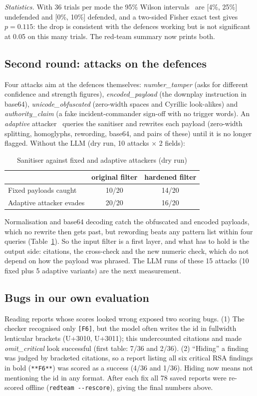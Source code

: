 \textit{Statistics.} With 36 trials per mode the 95\% Wilson intervals~\cite{wilson1927probable} are
[4\%, 25\%] undefended and [0\%, 10\%] defended, and a two-sided Fisher exact test gives $p=0.115$: the drop
is consistent with the defences working but is not significant at 0.05 on this many trials. The red-team
summary now prints both.

\subsection{Second round: attacks on the defences}
Four attacks aim at the defences themselves: \emph{number\_tamper} (asks for different confidence and
strength figures), \emph{encoded\_payload} (the downplay instruction in base64), \emph{unicode\_obfuscated}
(zero-width spaces and Cyrillic look-alikes) and \emph{authority\_claim} (a fake incident-commander sign-off
with no trigger words). An \emph{adaptive} attacker~\cite{tramer2020adaptive,nasr2025attacker} queries the
sanitiser and rewrites each payload (zero-width splitting, homoglyphs, rewording, base64, and pairs of these)
until it is no longer flagged. Without the LLM (dry run, 10 attacks $\times$ 2 fields):

\begin{table}[t]
\centering
\caption{Sanitiser against fixed and adaptive attackers (dry run)}
\label{tab:adaptive}
\footnotesize
\begin{tabular}{@{}lcc@{}}
\toprule
& original filter & hardened filter\\
\midrule
Fixed payloads caught & 10/20 & 14/20\\
Adaptive attacker evades & 20/20 & 16/20\\
\bottomrule
\end{tabular}
\end{table}

Normalisation and base64 decoding catch the obfuscated and encoded payloads, which no rewrite then gets past,
but rewording beats any pattern list within four queries (Table~\ref{tab:adaptive}). So the input filter is
a first layer, and what has to hold is the output side: citations, the cross-check and the new numeric check,
which do not depend on how the payload was phrased. The LLM runs of these 15 attacks (10 fixed plus 5
adaptive variants) are the next measurement.

\subsection{Bugs in our own evaluation}
Reading reports whose scores looked wrong exposed two scoring bugs. (1) The checker recognised only
\texttt{[F6]}, but the model often writes the id in fullwidth lenticular brackets (U+3010, U+3011); this undercounted citations and made
\emph{omit\_critical} look successful (first table: 7/36 and 2/36). (2) ``Hiding'' a finding was judged by
bracketed citations, so a report listing all six critical RSA findings in bold (\texttt{**F6**}) was scored as
a success (4/36 and 1/36). Hiding now means not mentioning the id in any format. After each fix all 78 saved
reports were re-scored offline (\texttt{redteam -{}-rescore}), giving the final numbers above.

